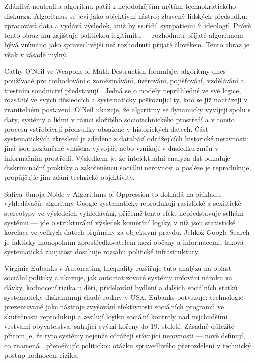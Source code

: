Zdánlivá neutralita algoritmu patří k nejodolnějším mýtům technokratického diskurzu.
Algoritmus se jeví jako objektivní nástroj zbavený lidských předsudků: zpracovává data a vydává výsledek, aniž by se řídil sympatiemi či ideologií.
Právě tento obraz mu zajišťuje politickou legitimitu — rozhodnutí přijaté algoritmem bývá vnímáno jako spravedlivější než rozhodnutí přijaté člověkem.
Tento obraz je však v zásadě mylný.

Cathy O'Neil ve Weapons of Math Destruction \parencite{ONeil16} formuluje: algoritmy dnes používané pro rozhodování o zaměstnávání, úvěrování, pojišťování, vzdělávání a trestním soudnictví představují . Jedná se o modely neprůhledné ve své logice, rozsáhlé ve svých důsledcích a systematicky poškozující ty, kdo se již nacházejí v zranitelném postavení. O'Neil ukazuje, že algoritmy se dynamicky vyvíjejí spolu s daty, systémy a lidmi v rámci složitého sociotechnického prostředí a v tomto procesu vstřebávají předsudky obsažené v historických datech. Část systematických zkreslení je zděděna z databází odrážejících historické nerovnosti; jiná jsou nezáměrně vnášena vývojáři nebo vznikají v důsledku změn v informačním prostředí. Výsledkem je, že intelektuální analýza dat odhaluje diskriminační praktiky a zakořeněnou sociální nerovnost a posléze je reprodukuje, propůjčujíc jim zdání technické objektivity.

Safiya Umoja Noble v Algorithms of Oppression \parencite{Noble18} to dokládá na příkladu vyhledávačů: algoritmy Google systematicky reprodukují rasistické a sexistické stereotypy ve výsledcích vyhledávání, přičemž tento efekt nepředstavuje selhání systému — jde o strukturální výsledek komerční logiky, v níž jsou statistické korelace ve velkých datech přijímány za objektivní pravdu. Jelikož Google Search je fakticky monopolním zprostředkovatelem mezi občany a informacemi, taková systematická zaujatost dosahuje rozsahu politické infrastruktury.

Virginia Eubanks v Automating Inequality \parencite{Eubanks18} rozšiřuje tuto analýzu na oblast sociální politiky a ukazuje, jak automatizované systémy určování nároku na dávky, hodnocení rizika u dětí, přidělování bydlení a dalších sociálních statků systematicky diskriminují chudé rodiny v USA.
Eubanks potvrzuje: technologie prezentované jako nástroje zvyšování efektivnosti sociálních programů ve skutečnosti reprodukují a zesilují logiku sociální kontroly nad nejchudšími vrstvami obyvatelstva, sahající svými kořeny do 19. století.
Zásadně důležité přitom je, že tyto systémy nejenže odrážejí stávající nerovnosti — nově definují, co znamená , přeměňujíc politickou otázku spravedlivého přerozdělení v technický postup hodnocení rizika.

